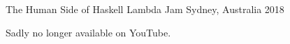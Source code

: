 


\begin{cventries}


\cventry
{The Human Side of Haskell} %
{Lambda Jam} %
{Sydney, Australia} %
{2018} %
{ %
\begin{cvitems}
\item { Sadly no longer available on YouTube. }
\end{cvitems}
}


\end{cventries}